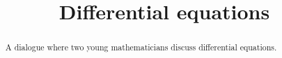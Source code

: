 \documentclass{ximera}
\title[Break-Ground:]{Differential equations}
\begin{document}
\begin{abstract}
A dialogue where two young mathematicians discuss differential equations.
\end{abstract}
\maketitle









\end{document}

